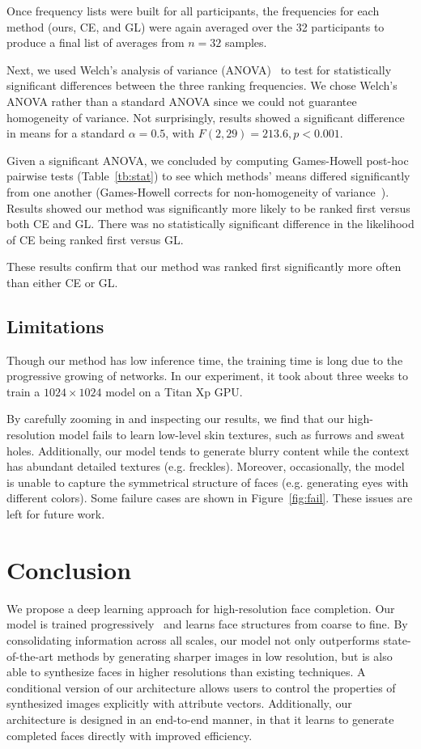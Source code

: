 \documentclass[acmtog,timestamp]{acmart}
\begin{document}
Once frequency lists were built for all participants, the frequencies for each method (ours, CE, and GL) were again averaged over the 32 participants to produce a final list of averages from $n=32$ samples.

Next, we used Welch's analysis of variance (ANOVA)~\cite{mcdonald2009handbook} to test for statistically significant differences between the three ranking frequencies. We chose Welch's ANOVA rather than a standard ANOVA since we could not guarantee homogeneity of variance. Not surprisingly, results showed a significant difference in means for a standard $\alpha = 0.5$, with $F(2,29) = 213.6, p < 0.001$.

Given a significant ANOVA, we concluded by computing Games-Howell post-hoc pairwise tests (Table~\ref{tb:stat}) to see which methods' means differed significantly from one another (Games-Howell corrects for non-homogeneity of variance~\cite{ruxton2008time}). Results showed our method was significantly more likely to be ranked first versus both CE and GL. There was no statistically significant difference in the likelihood of CE being ranked first versus GL.

These results confirm that our method was ranked first significantly more often than either CE or GL.

\subsection{Limitations}
Though our method has low inference time, the training time is long due to the progressive growing of networks. In our experiment, it took about three weeks to train a $1024\times1024$ model on a Titan Xp GPU.

By carefully zooming in and inspecting our results, we find that our high-resolution model fails to learn low-level skin textures, such as furrows and sweat holes. Additionally, our model tends to generate blurry content while the context has abundant detailed textures (e.g. freckles). Moreover, occasionally, the model is unable to capture the symmetrical structure of faces (e.g. generating eyes with different colors). Some failure cases are shown in Figure~\ref{fig:fail}. These issues are left for future work.

\section{Conclusion}
We propose a deep learning approach for high-resolution face completion. Our model is trained progressively~\cite{karras2017progressive} and learns face structures from coarse to fine. By consolidating information across all scales, our model not only outperforms state-of-the-art methods by generating sharper images in low resolution, but is also able to synthesize faces in higher resolutions than existing techniques. A conditional version of our architecture allows users to control the properties of synthesized images explicitly with attribute vectors. Additionally, our architecture is designed in an end-to-end manner, in that it learns to generate completed faces directly with improved efficiency.
\end{document}
